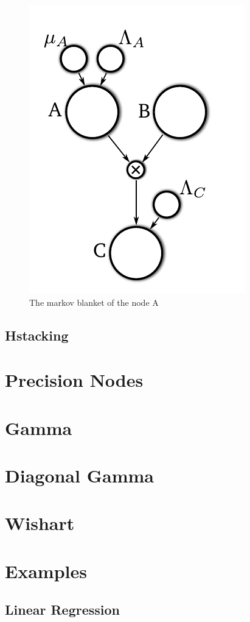 \documentclass{article}
\newcommand{\<}{\langle}
\renewcommand{\>}{\rangle}
\begin{document}
\begin{figure}
\includegraphics{images/mult_markov}
\caption{The markov blanket of the node A}
\label{fig:mult_markov}
\end{figure}

\subsection{Hstacking}

\section{Precision Nodes}
\section{Gamma}
\section{Diagonal Gamma}
\section{Wishart}

\section{Examples}
\subsection{Linear Regression}
\end{document}
